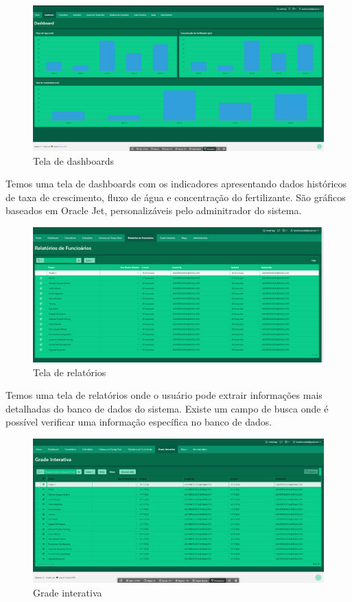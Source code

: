 \begin{figure}[!h]
\centering
\caption{Tela de dashboards}
\label{fig:picture20}
\includegraphics[scale=0.2]{Illustrations/Tela_dashboard.png}
\end{figure}

Temos uma tela de dashboards com os indicadores apresentando dados históricos de taxa de crescimento, fluxo de água e concentração do fertilizante. São gráficos baseados em Oracle Jet, personalizáveis pelo adminitrador do sistema.

\begin{figure}[!h]
\centering
\caption{Tela de relatórios}
\label{fig:picture21}
\includegraphics[scale=0.2]{Illustrations/Tela_relatorios_func.png}
\end{figure}

Temos uma tela de relatórios onde o usuário pode extrair informações mais detalhadas do banco de dados do sistema. Existe um campo de busca onde é possível verificar uma informação específica no banco de dados.

\begin{figure}[!h]
\centering
\caption{Grade interativa}
\label{fig:picture22}
\includegraphics[scale=0.2]{Illustrations/Tela_grade_interativa.png}
\end{figure}
    
